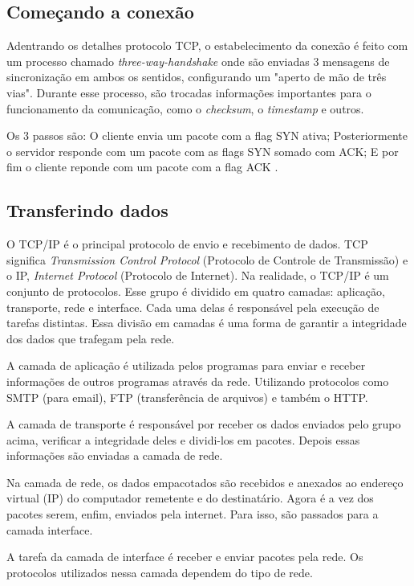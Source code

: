 \documentclass[12pt]{article}
\begin{document}
\subsection{Começando a conexão}
Adentrando os detalhes protocolo TCP, o estabelecimento da conexão é feito com um processo chamado \emph{three-way-handshake} onde são enviadas 3 mensagens de sincronização em ambos os sentidos, configurando um "aperto de mão de três vias". Durante esse processo, são trocadas informações importantes para o funcionamento da comunicação, como o \emph{checksum}, o \emph{timestamp} e outros.

Os 3 passos são: O cliente envia um pacote com a flag SYN ativa; Posteriormente o servidor responde com um pacote com as flags SYN somado com ACK; E por fim o cliente reponde com um pacote com a flag ACK \cite{gitbook}.

\subsection{Transferindo dados}
\cite{tecmundo} O TCP/IP é o principal protocolo de envio e recebimento de dados. TCP significa \emph{Transmission Control Protocol} (Protocolo de Controle de Transmissão) e o IP, \emph{Internet Protocol} (Protocolo de Internet). Na realidade, o TCP/IP é um conjunto de protocolos. Esse grupo é dividido em quatro camadas: aplicação, transporte, rede e interface. Cada uma delas é responsável pela execução de tarefas distintas. Essa divisão em camadas é uma forma de garantir a integridade dos dados que trafegam pela rede.

A camada de aplicação é utilizada pelos programas para enviar e receber informações de outros programas através da rede. Utilizando protocolos como SMTP (para email), FTP (transferência de arquivos) e também o HTTP.

A camada de transporte é responsável por receber os dados enviados pelo grupo acima, verificar a integridade deles e dividi-los em pacotes. Depois essas informações são enviadas a camada de rede.

Na camada de rede, os dados empacotados são recebidos e anexados ao endereço virtual (IP) do computador remetente e do destinatário. Agora é a vez dos pacotes serem, enfim, enviados pela internet. Para isso, são passados para a camada interface.

A tarefa da camada de interface é receber e enviar pacotes pela rede. Os protocolos utilizados nessa camada dependem do tipo de rede.
\end{document}

